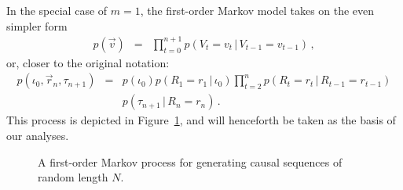 \documentclass[a4paper]{article}
\begin{document}
In the special case of $m=1$, the first-order Markov model takes on the even simpler form
\begin{eqnarray}
p(\vec{v}) & = & \prod_{t=0}^{n+1}p(V_t=v_t\,|\,V_{t-1}=v_{t-1})\,,
\end{eqnarray}
or, closer to the original notation:
\begin{eqnarray}
\!\!p(\iota_0,\vec{r}_n,\tau_{n+1}) & = & 
p(\iota_0)p(R_1=r_1\,|\,\iota_0)
\prod_{t=2}^{n}p(R_t=r_t\,|\,R_{t-1}=r_{t-1})
\nonumber\\&&
p(\tau_{n+1}\,|\,R_n=r_n)
\,.
\end{eqnarray}
This process is depicted in Figure~\ref{fig:markov-1-process}, and will henceforth be taken as the basis of our analyses.
\begin{figure}[hbt]
\centering
{}
\caption{A first-order Markov process for generating causal sequences of random length $N$.}
\label{fig:markov-1-process}
\end{figure}
\end{document}
